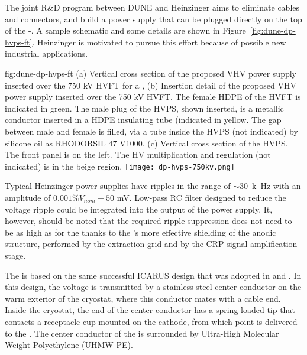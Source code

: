 The joint R\&D program between DUNE and Heinzinger aims to eliminate cables and connectors, and build a power supply that can be plugged directly on the top of the \hv{}-\fdth.  A sample schematic and some details are shown in Figure~\ref{fig:dune-dp-hvps-ft}. 
Heinzinger is motivated to pursue this effort because of possible new industrial applications.

\begin{dunefigure}
{fig:dune-dp-hvps-ft}
{(a) Vertical cross section of the proposed VHV power supply inserted over the 750 kV HVFT for a \dpmod{}, 
(b) Insertion detail of the proposed VHV power supply inserted over the 750 kV HVFT. The female HDPE of the HVFT is indicated in green. The male plug of the HVPS, shown inserted, is a metallic conductor inserted in a HDPE insulating tube (indicated in yellow. The gap between male and female is filled, via a tube inside the HVPS (not indicated) by silicone oil as RHODORSIL 47 V1000. (c) Vertical cross section of the HVPS. The front panel is on the left. The HV multiplication and regulation (not indicated) is in the beige region.}
\texttt{[image: dp-hvps-750kv.png]}
\end{dunefigure}


Typical Heinzinger power supplies have ripples in the range of $\sim$\SI{30}{k\hertz} with an amplitude of $0.001\%V_{nom} \pm 50$ mV. Low-pass RC filter designed to reduce the voltage ripple could be integrated into the output of the power supply.  It, however, should be noted that the required ripple suppression does not need to be as high as for the  thanks to the 's more effective shielding of the anodic structure, performed by the extraction grid and by the CRP signal amplification stage. 


The \hv \fdth is based on the same successful ICARUS design that was adopted in  and .  In this design, the voltage is transmitted by a stainless steel center conductor on the warm exterior of the cryostat, where this conductor mates with a cable end.  Inside the cryostat, the end of the center conductor has a spring-loaded tip that  contacts a receptacle cup mounted on the cathode, from which point \hv is delivered to the \fc.  The center conductor of the \fdth is surrounded by Ultra-High Molecular Weight Polyethylene (UHMW PE).  


